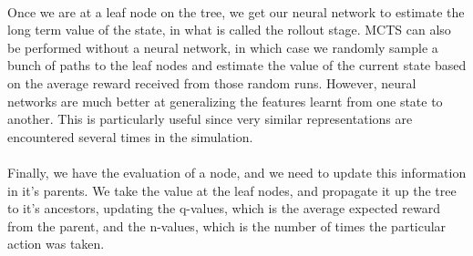 \documentclass[%
 reprint,
 longbibliography,
 amsmath,amssymb,
 aps,
]{revtex4-2}
\begin{document}
\paragraph{} Once we are at a leaf node on the tree, we get our neural network to estimate the long term value of the state, in what is called the rollout stage. MCTS can also be performed without a neural network, in which case we randomly sample a bunch of paths to the leaf nodes and estimate the value of the current state based on the average reward received from those random runs. However, neural networks are much better at generalizing the features learnt from one state to another. This is particularly useful since very similar representations are encountered several times in the simulation.

\paragraph{} Finally, we have the evaluation of a node, and we need to update this information in it's parents. We take the value at the leaf nodes, and propagate it up the tree to it's ancestors, updating the q-values, which is the average expected reward from the parent, and the n-values, which is the number of times the particular action was taken.
\end{document}
